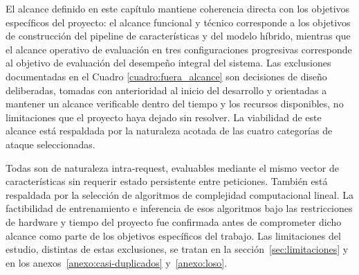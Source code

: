 El alcance definido en este capítulo mantiene coherencia directa con los objetivos específicos del proyecto: el alcance funcional y técnico corresponde a los objetivos de construcción del pipeline de características y del modelo híbrido, mientras que el alcance operativo de evaluación en tres configuraciones progresivas corresponde al objetivo de evaluación del desempeño integral del sistema. Las exclusiones documentadas en el Cuadro \ref{cuadro:fuera_alcance} son decisiones de diseño deliberadas, tomadas con anterioridad al inicio del desarrollo y orientadas a mantener un alcance verificable dentro del tiempo y los recursos disponibles, no limitaciones que el proyecto haya dejado sin resolver. La viabilidad de este alcance está respaldada por la naturaleza acotada de las cuatro categorías de ataque seleccionadas.

Todas son de naturaleza intra-request, evaluables mediante el mismo vector de características sin requerir estado persistente entre peticiones. También está respaldada por la selección de algoritmos de complejidad computacional lineal. La factibilidad de entrenamiento e inferencia de esos algoritmos bajo las restricciones de hardware y tiempo del proyecto fue confirmada antes de comprometer dicho alcance como parte de los objetivos específicos del trabajo. Las limitaciones del estudio, distintas de estas exclusiones, se tratan en la sección~\ref{sec:limitaciones} y en los anexos~\ref{anexo:casi-duplicados} y~\ref{anexo:loso}.
